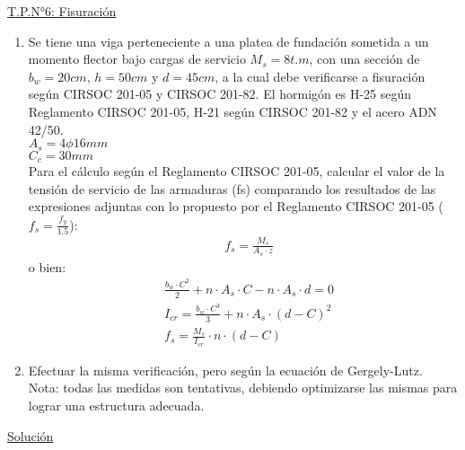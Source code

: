 \begin{center}
\underline{\Large{T.P.N°6: Fisuración}}
\end{center}

\begin{enumerate}
\item Se tiene una viga perteneciente a una platea de fundación sometida a un momento flector bajo cargas de servicio $M_s = 8 t.m$, con una sección de $b_w = 20 cm$, $h = 50 cm$ y $d = 45 cm$, a la cual debe verificarse a fisuración según CIRSOC 201-05 y CIRSOC 201-82. El hormigón es H-25 según Reglamento CIRSOC 201-05, H-21 según CIRSOC 201-82 y el acero ADN 42/50.\\
$A_s = 4 \phi 16 mm$\\
$C_c = 30 mm$\\
Para el cálculo según el Reglamento CIRSOC 201-05, calcular el valor de la tensión de servicio de las armaduras (fs) comparando los resultados de las expresiones adjuntas con lo propuesto por el Reglamento CIRSOC 201-05 ($f_s = \frac{f_y}{1.5}$):
\begin{align*}
& f_s = \frac{M_s}{A_s \cdot z}
\end{align*}
o bien:
\begin{align*}
& \frac{b_w \cdot C^2}{2} + n \cdot A_s \cdot C - n \cdot A_s \cdot d = 0 \\
& I_{cr} = \frac{b_w \cdot {C}^3}{3} + n \cdot A_s \cdot (d - C)^2 \\
& f_s = \frac{M_s}{I_{cr}} \cdot n \cdot (d - C)
\end{align*}
\item Efectuar la misma verificación, pero según la ecuación de Gergely-Lutz.\\
Nota: todas las medidas son tentativas, debiendo optimizarse las mismas para lograr una estructura adecuada.
\end{enumerate}

\newpage
\begin{center}
\underline{\Large{Solución}}
\end{center}

